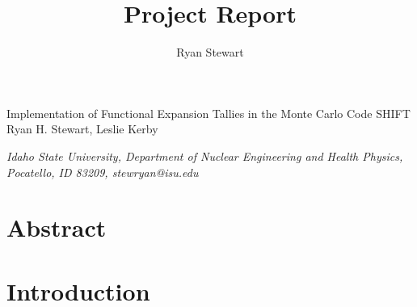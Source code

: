 \documentclass[10tma4paper]{article}
\title{Project Report}
\author{Ryan Stewart}
\begin{document}
	\begin{center}
		Implementation of Functional Expansion Tallies in the 
		Monte Carlo Code SHIFT
		\\
		\bigskip
		\small{Ryan H. Stewart, Leslie} Kerby
		\\
	\end{center}
	
	\begin{center}
		\textit{\small{Idaho State University, Department of Nuclear Engineering and Health Physics, Pocatello, ID 83209, stewryan@isu.edu}}
	\end{center}
	

\section{Abstract}\label{abstract}



\section{Introduction}\label{intro}
\end{document}
